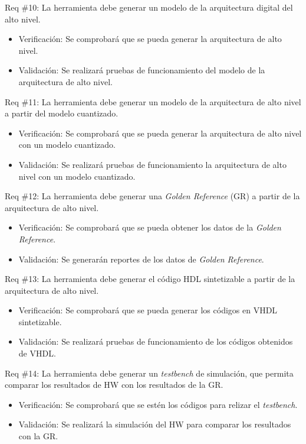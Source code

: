 \documentclass[11pt]{charter}
\begin{document}
Req \#10: La herramienta debe generar un modelo de la arquitectura digital del alto nivel.

\begin{itemize}
\item Verificación: Se comprobará que se pueda generar la arquitectura de alto nivel. 
\item Validación: Se realizará pruebas de funcionamiento del modelo de la arquitectura de alto nivel.  
\end{itemize}

Req \#11: La herramienta debe generar un modelo de la arquitectura de alto nivel a partir del modelo cuantizado.

\begin{itemize}
\item Verificación: Se comprobará que se pueda generar la arquitectura de alto nivel con un modelo cuantizado. 
\item Validación: Se realizará pruebas de funcionamiento la arquitectura de alto nivel con un modelo cuantizado.  
\end{itemize}


Req \#12: La herramienta debe generar una \textit{Golden Reference} (GR) a partir de la arquitectura de alto nivel.

\begin{itemize}
\item Verificación: Se comprobará que se pueda obtener los datos de la \textit{Golden Reference}. 
\item Validación: Se generarán reportes de los datos de \textit{Golden Reference}.  
\end{itemize}

Req \#13: La herramienta debe generar el código HDL sintetizable a partir de la arquitectura de alto nivel.

\begin{itemize}
\item Verificación: Se comprobará que se pueda generar los códigos en VHDL sintetizable. 
\item Validación: Se realizará pruebas de funcionamiento de los códigos obtenidos de VHDL.  
\end{itemize}

Req \#14: La herramienta debe generar un \textit{testbench} de simulación, que permita comparar los resultados de HW con los resultados de la GR.

\begin{itemize}
\item Verificación: Se comprobará que se estén los códigos para relizar el \textit{testbench}. 
\item Validación: Se realizará la simulación del HW para comparar los resultados con la GR.  
\end{itemize}
\end{document}

